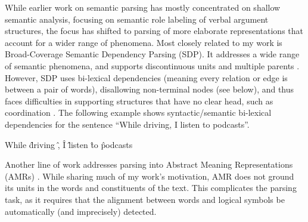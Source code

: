 \documentclass[12pt,a4paper,table]{report}
\begin{document}
While earlier work on semantic parsing has mostly concentrated on shallow semantic analysis,
focusing on semantic role labeling of verbal argument structures,
the focus has shifted to parsing of more elaborate representations that account
for a wider range of phenomena. 
Most closely related to my work is Broad-Coverage Semantic Dependency Parsing (SDP).
It addresses a wide range of semantic phenomena,
and supports discontinuous units and multiple parents \citep{oepen2016towards}.
However, SDP uses bi-lexical dependencies
(meaning every relation or edge is between a pair of words),
disallowing non-terminal nodes (see below),
and thus faces difficulties in supporting
structures that have no clear head, such as coordination \citep{Ivanova2012who}.
The following example shows {syntactic}/{semantic} bi-lexical dependencies for the sentence ``While driving, I listen to podcasts''.

    \begin{adjustbox}{center}
    \begin{dependency}[line width=1.5pt]
        \begin{deptext}[column sep=1.5em,ampersand replacement=\^,font=\rmfamily]
          While \^ driving \^ , \^ I \^ listen \^ to \^ podcasts \\
        \end{deptext}
    \end{dependency}
    \end{adjustbox}

Another line of work addresses parsing into Abstract Meaning Representations (AMRs)
\citep{banarescu2013abstract,flanigan2014discriminative,vanderwende2015amr,pust2015parsing,artzi2015broad}. 
While sharing much of my work's motivation,
AMR does not ground its units in the words and constituents of the text.
This complicates the parsing task, as it requires
that the alignment between words and logical symbols be automatically
(and imprecisely) detected.
\end{document}
